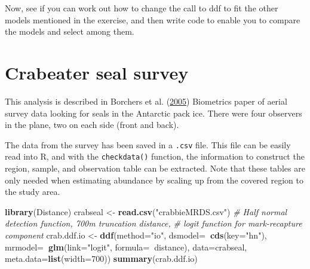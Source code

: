 \documentclass[]{book}
\newenvironment{Shaded}{\begin{snugshade}}{\end{snugshade}}
\newcommand{\KeywordTok}[1]{\textcolor[rgb]{0.13,0.29,0.53}{\textbf{#1}}}
\newcommand{\DataTypeTok}[1]{\textcolor[rgb]{0.13,0.29,0.53}{#1}}
\newcommand{\DecValTok}[1]{\textcolor[rgb]{0.00,0.00,0.81}{#1}}
\newcommand{\StringTok}[1]{\textcolor[rgb]{0.31,0.60,0.02}{#1}}
\newcommand{\CommentTok}[1]{\textcolor[rgb]{0.56,0.35,0.01}{\textit{#1}}}
\newcommand{\OperatorTok}[1]{\textcolor[rgb]{0.81,0.36,0.00}{\textbf{#1}}}
\newcommand{\NormalTok}[1]{#1}
\theoremstyle{definition}
\theoremstyle{definition}
\theoremstyle{remark}
\begin{document}
Now, see if you can work out how to change the call to ddf to fit the
other models mentioned in the exercise, and then write code to enable
you to compare the models and select among them.

\section{Crabeater seal survey}\label{crabeater-seal-survey}

This analysis is described in Borchers et al.
(\protect\hyperlink{ref-Borchers_2005}{2005}) Biometrics paper of aerial
survey data looking for seals in the Antarctic pack ice. There were four
observers in the plane, two on each side (front and back).

The data from the survey has been saved in a \texttt{.csv} file. This
file can be easily read into R, and with the \texttt{checkdata()}
function, the information to construct the region, sample, and
observation table can be extracted. Note that these tables are only
needed when estimating abundance by scaling up from the covered region
to the study area.

\begin{Shaded}
\begin{Highlighting}[]
\KeywordTok{library}\NormalTok{(Distance)}
\NormalTok{crabseal <-}\StringTok{ }\KeywordTok{read.csv}\NormalTok{(}\StringTok{"crabbieMRDS.csv"}\NormalTok{)}
\CommentTok{#  Half normal detection function, 700m truncation distance, }
\CommentTok{#      logit function for mark-recapture component}
\NormalTok{crab.ddf.io <-}\StringTok{ }\KeywordTok{ddf}\NormalTok{(}\DataTypeTok{method=}\StringTok{"io"}\NormalTok{, }\DataTypeTok{dsmodel=}\OperatorTok{~}\KeywordTok{cds}\NormalTok{(}\DataTypeTok{key=}\StringTok{"hn"}\NormalTok{),}
                 \DataTypeTok{mrmodel=}\OperatorTok{~}\KeywordTok{glm}\NormalTok{(}\DataTypeTok{link=}\StringTok{"logit"}\NormalTok{, }\DataTypeTok{formula=}\OperatorTok{~}\NormalTok{distance),}
                 \DataTypeTok{data=}\NormalTok{crabseal, }\DataTypeTok{meta.data=}\KeywordTok{list}\NormalTok{(}\DataTypeTok{width=}\DecValTok{700}\NormalTok{))}
\KeywordTok{summary}\NormalTok{(crab.ddf.io)}
\end{Highlighting}
\end{Shaded}
\end{document}
